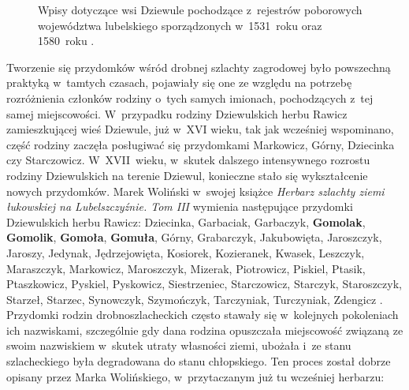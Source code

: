 \begin{figure}[!ht]
    \centering
    \qquad
    \caption{Wpisy dotyczące wsi Dziewule pochodzące z~rejestrów poborowych 
    województwa lubelskiego sporządzonych w~1531~roku oraz 1580~roku 
    \cite{apawinski}.}
    \label{fig:dziewule_1531_1580}
\end{figure}

Tworzenie się przydomków wśród drobnej szlachty zagrodowej było powszechną 
praktyką w~tamtych czasach, pojawiały się one ze względu na potrzebę 
rozróżnienia członków rodziny o~tych samych imionach, pochodzących z~tej 
samej miejscowości. W~przypadku rodziny Dziewulskich herbu Rawicz 
zamieszkującej wieś Dziewule, już w~XVI wieku, tak jak wcześniej wspominano, 
część rodziny zaczęła posługiwać się przydomkami Markowicz, Górny, Dziecinka 
czy Starczowicz. W~XVII~wieku, w~skutek dalszego intensywnego rozrostu 
rodziny Dziewulskich na terenie Dziewul, konieczne stało się wykształcenie 
nowych przydomków. Marek Woliński w~swojej książce \emph{Herbarz szlachty 
ziemi łukowskiej na Lubelszczyźnie. Tom III} wymienia następujące przydomki 
Dziewulskich herbu Rawicz: Dziecinka, Garbaciak, Garbaczyk, 
\textbf{Gomolak}, \textbf{Gomolik}, \textbf{Gomoła}, \textbf{Gomuła}, Górny, 
Grabarczyk, Jakubowięta, Jaroszczyk, Jaroszy, Jedynak, Jędrzejowięta, 
Kosiorek, Kozieranek, Kwasek, Leszczyk, Maraszczyk, Markowicz, Maroszczyk, 
Mizerak, Piotrowicz, Piskiel, Ptasik, Ptaszkowicz, Pyskiel, Pyskowicz, 
Siestrzeniec, Starczowicz, Starczyk, Staroszczyk, Starzeł, Starzec, 
Synowczyk, Szymończyk, Tarczyniak, Turczyniak, Zdengicz \cite{wolinski}. 
Przydomki rodzin drobnoszlacheckich często stawały się w~kolejnych 
pokoleniach ich nazwiskami, szczególnie gdy dana rodzina opuszczała 
miejscowość związaną ze swoim nazwiskiem w~skutek utraty własności ziemi, 
ubożała i~ze stanu szlacheckiego była degradowana do stanu chłopskiego. Ten 
proces został dobrze opisany przez Marka Wolińskiego, w~przytaczanym już tu 
wcześniej herbarzu:


